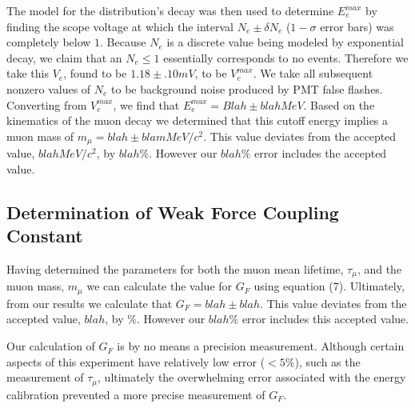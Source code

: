 The model for the distribution's decay was then used to determine
$E_{e}^{max}$ by finding the scope voltage at which the interval
$N_{e}\pm \delta N_{e}$ ($1-\sigma$ error bars) was completely below
$1$.  Because $N_{e}$ is a discrete value being modeled by exponential
decay, we claim that an $N_{e} \leq 1$ essentially corresponds to no
events.  Therefore we take this $V_{e}$, found to be $1.18\pm.10 mV$,
to be $V_{e}^{max}$. We take all subsequent nonzero values of $N_{e}$
to be background noise produced by PMT false flashes.  Converting from
$V_{e}^{max}$, we find that $E_{e}^{max}=Blah \pm blah MeV$.  Based on
the kinematics of the muon decay we determined that this cutoff energy
implies a muon mass of $m_{\mu} = blah \pm blam MeV/c^{2}$.  This
value deviates from the accepted value, $blah MeV/c^{2}$, by $blah\%$.
However our $blah\%$ error includes the accepted value.

\subsection{Determination of Weak Force Coupling Constant}

Having determined the parameters for both the muon mean lifetime, $\tau_{\mu}$, and the muon mass, $m_{\mu}$ we can calculate the value for $G_{F}$ using equation (7). Ultimately, from our results we calculate that $G_{F}=blah \pm blah$.  This value deviates from the accepted value, $blah$, by $\%$. However our $blah\%$ error includes this accepted value.

Our calculation of $G_F$ is by no means a precision measurement.  Although certain aspects of this experiment have relatively low error ($< 5\%$), such as the measurement of $\tau_{\mu}$, ultimately the overwhelming error associated with the energy calibration prevented a more precise measurement of $G_F$.